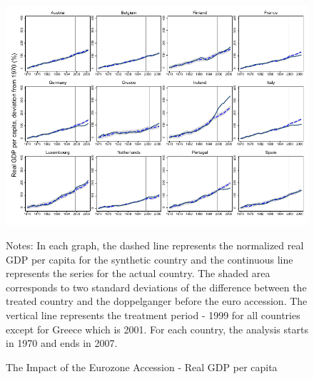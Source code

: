 \documentclass[12pt]{article}
\newcommand{\annote}[1]{\parbox{\textwidth}{\renewcommand{\baselinestretch}{1.0}\vspace{12pt} \small Notes: #1}}
\begin{document}
\begin{appendices}
\begin{figure}[h!]
    \centering
    \caption{The Impact of the Eurozone Accession - Real GDP per capita}
    \label{F_rgdpnapc}
    \includegraphics[width=\textwidth]{Output/Figures/SCM_normgdppc_s_Annual.pdf}
    \annote{In each graph, the dashed line represents the normalized real GDP per capita for the synthetic country and the continuous line represents the series for the actual country. The shaded area corresponds to two standard deviations of the difference between the treated country and the doppelganger before the euro accession. The vertical line represents the treatment period - 1999 for all countries except for Greece which is 2001. For each country, the analysis starts in 1970 and ends in 2007. }
    \label{F_normgdppc}
\end{figure}


\end{appendices}
\end{document}
